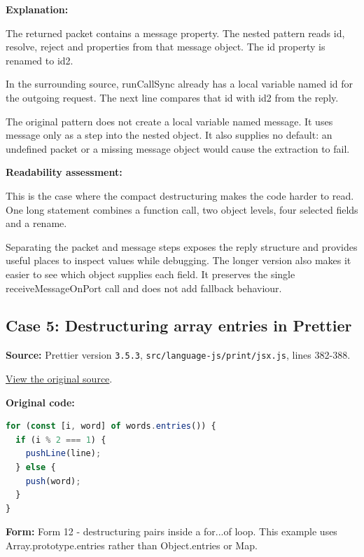\documentclass[
  10pt,
  a4paper,
  titlepage]{article}
\newcommand{\passthrough}[1]{#1}
\begin{document}

\textbf{Explanation:}

The returned packet contains a message property. The nested pattern
reads id, resolve, reject and properties from that message object. The
id property is renamed to id2.

In the surrounding source, runCallSync already has a local variable
named id for the outgoing request. The next line compares that id with
id2 from the reply.

The original pattern does not create a local variable named message. It
uses message only as a step into the nested object. It also supplies no
default: an undefined packet or a missing message object would cause the
extraction to fail.

\textbf{Readability assessment:}

This is the case where the compact destructuring makes the code harder
to read. One long statement combines a function call, two object levels,
four selected fields and a rename.

Separating the packet and message steps exposes the reply structure and
provides useful places to inspect values while debugging. The longer
version also makes it easier to see which object supplies each field. It
preserves the single receiveMessageOnPort call and does not add fallback
behaviour.

\subsection{Case 5: Destructuring array entries in
Prettier}\label{case-5-destructuring-array-entries-in-prettier}

\textbf{Source:} Prettier version \passthrough{\lstinline!3.5.3!},
\passthrough{\lstinline!src/language-js/print/jsx.js!}, lines 382-388.

\href{https://github.com/prettier/prettier/blob/3.5.3/src/language-js/print/jsx.js\#L382-L388}{View
the original source}.

\textbf{Original code:}

\Needspace{82.4pt}
\begin{lstlisting}[language=JavaScript]
for (const [i, word] of words.entries()) {
  if (i % 2 === 1) {
    pushLine(line);
  } else {
    push(word);
  }
}
\end{lstlisting}

\textbf{Form:} Form 12 - destructuring pairs inside a for...of loop.
This example uses Array.prototype.entries rather than Object.entries or
Map.
\end{document}
